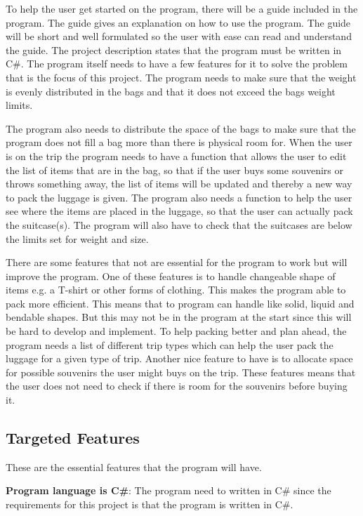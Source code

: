 To help the user get started on the program, there will be a guide included in the program. The guide gives an explanation on how to use the program. The guide will be short and well formulated so the user with ease can read and understand the guide.
The project description states that the program must be written in C\#.
The program itself needs to have a few features for it to solve the problem that is the focus of this project. The program needs to make sure that the weight is evenly distributed in the bags and that it does not exceed the bags weight limits. 

The program also needs to distribute the space of the bags to make sure that the program does not fill a bag more than there is physical room for.
When the user is on the trip the program needs to have a function that allows the user to edit the list of items that are in the bag, so that if the user buys some souvenirs or throws something away, the list of items will be updated and thereby a new way to pack the luggage is given.
The program also needs a function to help the user see where the items are placed in the luggage, so that the user can actually pack the suitcase(s).
The program will also have to check that the suitcases are below the limits set for weight and size.

There are some features that not are essential for the program to work but will improve the program. One of these features is to handle changeable shape of items e.g. a T-shirt or other forms of clothing. This makes the program able to pack more efficient. This means that to program can handle like solid, liquid and bendable shapes. But this may not be in the program at the start since this will be hard to develop and implement.
To help packing better and plan ahead, the program needs a list of different trip types which can help the user pack the luggage for a given type of trip.
Another nice feature to have is to allocate space for possible souvenirs the user might buys on the trip. These features means that the user does not need to check if there is room for the souvenirs before buying it.

\subsection{Targeted Features}
These are the essential features that the program will have.\newline

\textbf{Program language is C\#}:
The program need to written in C\# since the requirements for this project is that the program is written in C\#.

